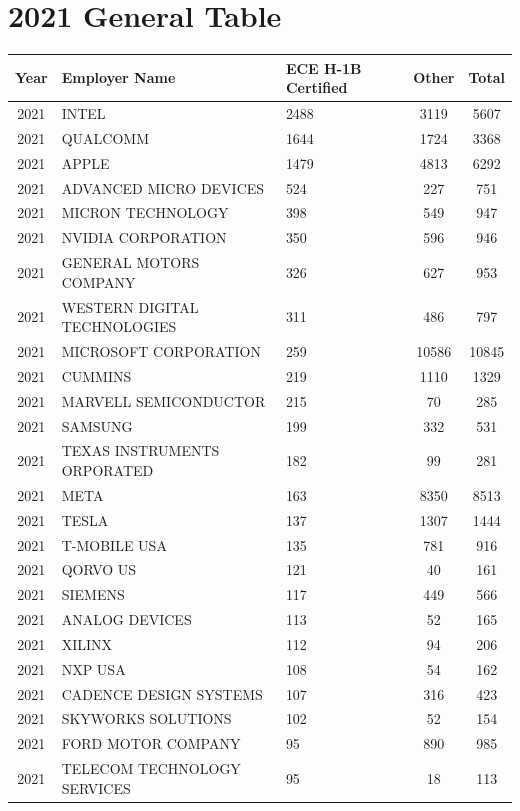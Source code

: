 \documentclass{article}%
\begin{document}
\section{2021 General Table}%
\label{sec:2021GeneralTable}%
\begin{longtable}{c|p{20em}|p{5em}|c|c}%
\hline%
Year&Employer Name&ECE \newline%
 H{-}1B \newline%
 Certified&Other&Total\\%
\hline%
2021&INTEL&2488&3119&5607\\%
\hline%
2021&QUALCOMM&1644&1724&3368\\%
\hline%
2021&APPLE&1479&4813&6292\\%
\hline%
2021&ADVANCED MICRO DEVICES&524&227&751\\%
\hline%
2021&MICRON TECHNOLOGY&398&549&947\\%
\hline%
2021&NVIDIA CORPORATION&350&596&946\\%
\hline%
2021&GENERAL MOTORS COMPANY&326&627&953\\%
\hline%
2021&WESTERN DIGITAL TECHNOLOGIES&311&486&797\\%
\hline%
2021&MICROSOFT CORPORATION&259&10586&10845\\%
\hline%
2021&CUMMINS&219&1110&1329\\%
\hline%
2021&MARVELL SEMICONDUCTOR&215&70&285\\%
\hline%
2021&SAMSUNG&199&332&531\\%
\hline%
2021&TEXAS INSTRUMENTS ORPORATED&182&99&281\\%
\hline%
2021&META&163&8350&8513\\%
\hline%
2021&TESLA&137&1307&1444\\%
\hline%
2021&T{-}MOBILE USA&135&781&916\\%
\hline%
2021&QORVO US&121&40&161\\%
\hline%
2021&SIEMENS&117&449&566\\%
\hline%
2021&ANALOG DEVICES&113&52&165\\%
\hline%
2021&XILINX&112&94&206\\%
\hline%
2021&NXP USA&108&54&162\\%
\hline%
2021&CADENCE DESIGN SYSTEMS&107&316&423\\%
\hline%
2021&SKYWORKS SOLUTIONS&102&52&154\\%
\hline%
2021&FORD MOTOR COMPANY&95&890&985\\%
\hline%
2021&TELECOM TECHNOLOGY SERVICES&95&18&113\\%
\hline%

\end{longtable}
\end{document}
